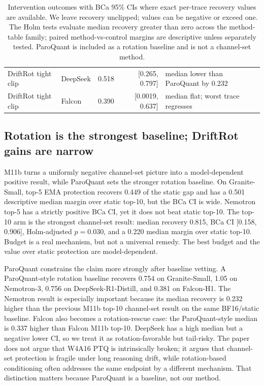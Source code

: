 \documentclass{article}
\begin{document}
\begin{table}[t]
{\begin{tabular}{@{}llrrl@{}}
DriftRot tight clip & DeepSeek & 0.518 & [0.265, 0.797] & median lower than ParoQuant by 0.232 \\
DriftRot tight clip & Falcon & 0.390 & [0.0019, 0.637] & median flat; worst trace regresses \\
\bottomrule
\end{tabular}}
\caption{Intervention outcomes with BCa 95\% CIs where exact per-trace recovery values are available. We leave recovery unclipped; values can be negative or exceed one. The Holm tests evaluate median recovery greater than zero across the method-table family; paired method-vs-control margins are descriptive unless separately tested. ParoQuant is included as a rotation baseline and is not a channel-set method.}
\label{tab:methods}
\end{table}

\subsection{Rotation is the strongest baseline; DriftRot gains are narrow}

M11b turns a uniformly negative channel-set picture into a model-dependent positive result, while ParoQuant sets the stronger rotation baseline. On Granite-Small, top-5 EMA protection recovers 0.449 of the static gap and has a 0.501 descriptive median margin over static top-10, but the BCa CI is wide. Nemotron top-5 has a strictly positive BCa CI, yet it does not beat static top-10. The top-10 arm is the strongest channel-set result: median recovery 0.815, BCa CI [0.158, 0.906], Holm-adjusted $p=0.030$, and a 0.220 median margin over static top-10. Budget is a real mechanism, but not a universal remedy. The best budget and the value over static protection are model-dependent.

ParoQuant constrains the claim more strongly after baseline vetting. A ParoQuant-style rotation baseline recovers 0.754 on Granite-Small, 1.05 on Nemotron-3, 0.756 on DeepSeek-R1-Distill, and 0.381 on Falcon-H1. The Nemotron result is especially important because its median recovery is 0.232 higher than the previous M11b top-10 channel-set result on the same BF16/static baseline. Falcon also becomes a rotation-rescue case: the ParoQuant-style median is 0.337 higher than Falcon M11b top-10. DeepSeek has a high median but a negative lower CI, so we treat it as rotation-favorable but tail-risky. The paper does not argue that W4A16 PTQ is intrinsically broken; it argues that channel-set protection is fragile under long reasoning drift, while rotation-based conditioning often addresses the same endpoint by a different mechanism. That distinction matters because ParoQuant is a baseline, not our method.
\end{document}

